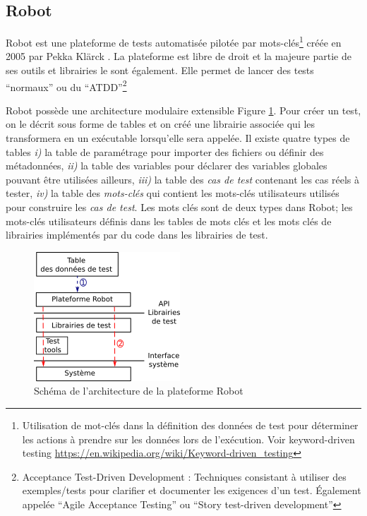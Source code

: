 \subsection{Robot}
\label{subsection:Robot}

Robot \citep{ROBOT_web} est une plateforme de tests automatisée pilotée par mots-clés\footnote{Utilisation de mot-clés dans la définition des données de test pour déterminer les actions à prendre sur les données lors de l'exécution. Voir keyword-driven testing  \url{https://en.wikipedia.org/wiki/Keyword-driven\_testing}} créée en 2005 par Pekka Klärck \citep{ROBOTlaukkanen2006data}. La plateforme est libre de droit et la majeure partie de ses outils et librairies le sont également. Elle permet de lancer des tests ``normaux'' ou du ``ATDD''\footnote{Acceptance Test-Driven Development \citep{ROBOTlarman2010practices}: Techniques consistant à utiliser des exemples/tests pour clarifier et documenter les exigences d'un test. Également appelée ``Agile Acceptance Testing'' ou ``Story test-driven development''}

Robot possède une architecture modulaire extensible
Figure \ref{Robot_arch}.  Pour créer un test, on le décrit sous forme de
tables et on créé une librairie associée qui les transformera en un
exécutable lorsqu'elle sera appelée. Il existe quatre types de tables
\textit{i)} la table de paramétrage pour importer des fichiers ou
définir des métadonnées, \textit{ii)} la table des variables pour
déclarer des variables globales pouvant être utilisées ailleurs,
\textit{iii)} la table des \textit{cas de test} contenant les cas
réels à tester, \textit{iv)} la table des \textit{mots-clés} qui
contient les mots-clés utilisateurs utilisés pour construire les
\textit{cas de test}.  Les mots clés sont de deux types dans Robot;
les mots-clés utilisateurs définis dans les tables de mots clés et les
mots clés de librairies implémentés par du code dans les librairies de
test.

\begin{figure}
  \centering
  \includegraphics{Pictures/png/Robot_architecture}
  \caption{Schéma de l'architecture de la plateforme Robot}
  \label{Robot_arch}
\end{figure}

